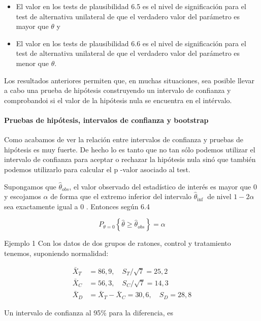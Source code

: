 \documentclass[
]{article}
\providecommand{\tightlist}{%
  \setlength{\itemsep}{0pt}\setlength{\parskip}{0pt}}
\begin{document}
\begin{itemize}
\tightlist
\item
  El valor en los tests de plausibilidad 6.5 es el nivel de significación para el test de alternativa unilateral de que el verdadero valor del parámetro es mayor que \(\theta\) y
\item
  El valor en los tests de plausibilidad 6.6 es el nivel de significación para el test de alternativa unilateral de que el verdadero valor del parámetro es menor que \(\theta\).
\end{itemize}

Los resultados anteriores permiten que, en muchas situaciones, sea posible llevar a cabo una prueba de hipótesis construyendo un intervalo de confianza y comprobandoi si el valor de la hipótesis nula se encuentra en el intérvalo.

\paragraph{Pruebas de hipótesis, intervalos de confianza y bootstrap}\label{pruebas-de-hipuxf3tesis-intervalos-de-confianza-y-bootstrap}

Como acabamos de ver la relación entre intervalos de confianza y pruebas de hipótesis es muy fuerte. De hecho lo es tanto que no tan sólo podemos utilizar el intervalo de confianza para aceptar o rechazar la hipótesis nula sinó que también podemos utilizarlo para calcular el p -valor asociado al test.

Supongamos que \(\hat{\theta}_{o b s}\), el valor observado del estadístico de interés es mayor que 0 y escojamos \(\alpha\) de forma que el extremo inferior del intervalo \(\hat{\theta}_{\text {inf }}\) de nivel \(1-2 \alpha\) sea exactamente igual a 0 . Entonces según 6.4

\[
P_{\theta=0}\left\{\hat{\theta} \geq \hat{\theta}_{o b s}\right\}=\alpha
\]

Ejemplo 1 Con los datos de dos grupos de ratones, control y tratamiento tenemos, suponiendo normalidad:

\[
\begin{aligned}
\bar{X}_{T} & =86,9, \quad S_{T} / \sqrt{7}=25,2 \\
\bar{X}_{C} & =56,3, \quad S_{C} / \sqrt{7}=14,3 \\
\bar{X}_{D} & =\bar{X}_{T}-\bar{X}_{C}=30,6, \quad S_{D}=28,8
\end{aligned}
\]

Un intervalo de confianza al 95\% para la diferencia, es
\end{document}
